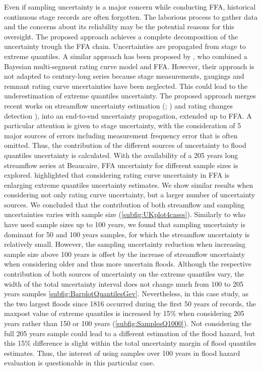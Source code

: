 \documentclass[11pt]{article}
\begin{document}
    Even if sampling uncertainty is a major concern while conducting FFA, historical continuous stage records are often forgotten. The laborious process to gather data and the concerns about its reliability may be the potential reasons for this oversight. The proposed approach achieves a complete decomposition of the uncertainty trough the FFA chain. Uncertainties are propagated from stage to extreme quantiles. A similar approach has been proposed by \citet{steinbakk_propagation_2016}, who combined a Bayesian multi-segment rating curve model and FFA. However, their approach is not adapted to century-long series because stage measurements, gaugings and remnant rating curve uncertainties have been neglected. This could lead to the underestimation of extreme quantiles uncertainty. The proposed approach merges recent works on streamflow uncertainty estimation (\citet{horner_impact_2018}; \citet{mansanarez_shift_2019}) and rating changes detection \citep{darienzo_detection_2021}), into an end-to-end uncertainty propagation, extended up to FFA. A particular attention is given to stage uncertainty, with the consideration of 5 major sources of errors including measurement frequency error that is often omitted. Thus, the contribution of the different sources of uncertainty to flood quantiles uncertainty is calculated. With the availability of a 205 years long streamflow series at Beaucaire, FFA uncertainty for different sample sizes is explored. \citet{petersen-overleir_accounting_2009} highlighted that considering rating curve uncertainty in FFA is enlarging extreme quantiles uncertainty estimates. We show similar results when considering not only rating curve uncertainty, but a larger number of uncertainty sources. We concluded that the contribution of both streamflow and sampling uncertainties varies with sample size (\ref{subfig:UKplot4cases}). Similarly to \citet{steinbakk_propagation_2016} who have used sample sizes up to 100 years, we found that sampling uncertainty is dominant for 50 and 100 years samples, for which the streamflow uncertainty is relatively small. However, the sampling uncertainty reduction when increasing sample size above 100 years is offset by the increase of streamflow uncertainty when considering older and thus more uncertain floods. Although the respective contribution of both sources of uncertainty on the extreme quantiles vary, the width of the total uncertainty interval does not change much from 100 to 205 years samples \ref{subfig:BarplotQuantilesGev}. Nevertheless, in this case study, as the two largest floods since 1816 occurred during the first 50 years of records, the maxpost value of extreme quantiles is increased by 15\% when considering 205 years rather than 150 or 100 years (\ref{subfig:SamplesQ1000}). Not considering the full 205 years sample could lead to a different estimation of the flood hazard, but this 15\% difference is slight within the total uncertainty margin of flood quantiles estimates. Thus, the interest of using samples over 100 years in flood hazard evaluation is questionable in this particular case. 
    
\end{document}
